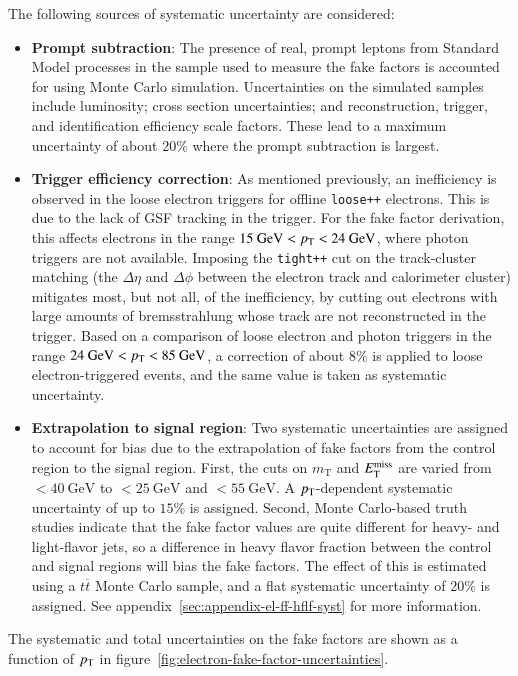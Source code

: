 The following sources of systematic uncertainty are considered:
\begin{itemize}
  \item \textbf{Prompt subtraction}: The presence of real, prompt leptons from Standard Model processes in the sample used to measure the fake factors is accounted for using Monte Carlo simulation. Uncertainties on the simulated samples include luminosity; cross section uncertainties; and reconstruction, trigger, and identification efficiency scale factors. These lead to a maximum uncertainty of about $20\%$ where the prompt subtraction is largest. 
  \item \textbf{Trigger efficiency correction}: As mentioned previously, an inefficiency is observed in the loose electron triggers for offline \verb.loose++. electrons. This is due to the lack of GSF tracking in the trigger. For the fake factor derivation, this affects electrons in the range $15~\mbox{GeV}<p_{\text{T}}<24~\mbox{GeV}$, where photon triggers are not available. Imposing the \verb.tight++. cut on the track-cluster matching (the $\Delta \eta$ and $\Delta \phi$ between the electron track and calorimeter cluster) mitigates most, but not all, of the inefficiency, by cutting out electrons with large amounts of bremsstrahlung whose track are not reconstructed in the trigger. Based on a comparison of loose electron and photon triggers in the range $24~\mbox{GeV}<p_{\text{T}}<85~\mbox{GeV}$, a correction of about $8\%$ is applied to loose electron-triggered events, and the same value is taken as systematic uncertainty.
  \item \textbf{Extrapolation to signal region}: Two systematic uncertainties are assigned to account for bias due to the extrapolation of fake factors from the control region to the signal region. First, the cuts on $m_{\mathrm{T}}$ and $E_{\text{T}}^{\text{miss}}$ are varied from $<40~\mbox{GeV}$ to $<25~\mbox{GeV}$ and $<55~\mbox{GeV}$. A $p_{\text{T}}$-dependent systematic uncertainty of up to $15\%$ is assigned. Second, Monte Carlo-based truth studies indicate that the fake factor values are quite different for heavy- and light-flavor jets, so a difference in heavy flavor fraction between the control and signal regions will bias the fake factors. The effect of this is estimated using a $t\overline{t}$ Monte Carlo sample, and a flat systematic uncertainty of $20\%$ is assigned. See appendix~\ref{sec:appendix-el-ff-hflf-syst} for more information.
\end{itemize}
The systematic and total uncertainties on the fake factors are shown as a function of $p_{\text{T}}$ in figure~\ref{fig:electron-fake-factor-uncertainties}.

